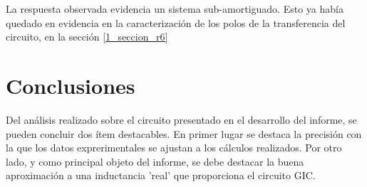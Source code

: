 La respuesta observada evidencia un sistema sub-amortiguado. Esto ya había quedado en evidencia en la caracterización de los polos de la transferencia del circuito, en la sección \ref{1_seccion_r6}

\section{Conclusiones}
Del análisis realizado sobre el circuito presentado en el desarrollo del informe, se pueden concluir dos ítem destacables. En primer lugar se destaca la precisión con la que los datos exprerimentales se ajustan a los cálculos realizados.
Por otro lado, y como principal objeto del informe, se debe destacar la buena aproximación a una inductancia 'real' que proporciona el circuito GIC. 